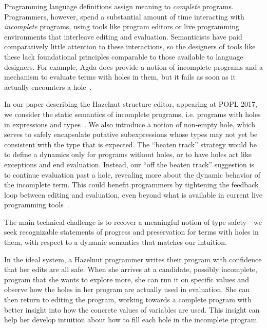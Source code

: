 
Programming language definitions assign meaning to \textit{complete}
programs. Programmers, however, spend a substantial amount of time
interacting with \textit{incomplete} programs, using tools like program
editors or live programming environments that interleave editing and
evaluation. Semanticists have paid comparatively little attention to these
interactions, so the designers of tools like these lack foundational
principles comparable to those available to language designers. For
example, Agda does provide a notion of incomplete programs and a mechanism
to evaluate terms with holes in them, but it fails as soon as it actually
encounters a hole~\cite{norell:thesis}.

In our paper describing the Hazelnut structure editor, appearing at POPL
2017, we consider the static semantics of incomplete programs,
i.e. programs with holes in expressions and types~\cite{hazelnut:popl}. We
also introduce a notion of non-empty hole, which serves to safely
encapsulate putative subexpressions whose types may not yet be consistent
with the type that is expected. The ``beaten track'' strategy would be to
define a dynamics only for programs without holes, or to have holes act
like exceptions and end evaluation. Instead, our ``off the beaten track''
suggestion is to continue evaluation past a hole, revealing more about the
dynamic behavior of the incomplete term. This could benefit programmers by
tightening the feedback loop between editing and evaluation, even beyond
what is available in current live programming tools~\cite{burckhardt2013s}.

The main technical challenge is to recover a meaningful notion of type
safety---we seek recognizable statements of progress and preservation for
terms with holes in them, with respect to a dynamic semantics that matches
our intuition.

In the ideal system, a Hazelnut programmer writes their program with
confidence that her edits are all safe. When she arrives at a candidate,
possibly incomplete, program that she wants to explore more, she can run it
on specific values and observe how the holes in her program are actually
used in evaluation. She can then return to editing the program, working
towards a complete program with better insight into how the concrete values
of variables are used. This insight can help her develop intuition about
how to fill each hole in the incomplete program.
